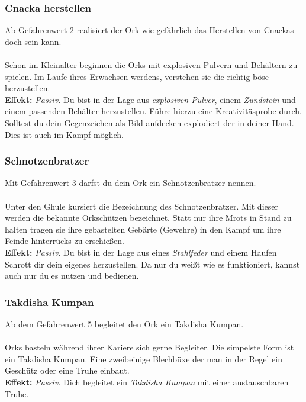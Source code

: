 \subsubsection*{ Cnacka herstellen} \label{sk:cnacka_herstellen}
Ab Gefahrenwert 2 realisiert der Ork wie gefährlich das Herstellen von Cnackas doch sein kann.\\
\\
Schon im Kleinalter beginnen die Orks mit explosiven Pulvern und Behältern zu spielen. Im Laufe ihres Erwachsen werdens, verstehen sie die  richtig böse herzustellen.\\
\textbf{Effekt:} \textit{Passiv.} Du bist in der Lage aus \textit{explosiven Pulver}, einem \textit{Zundstein} und einem passenden Behälter  herzustellen. Führe hierzu eine Kreativitäsprobe durch. Solltest du dein Gegenzeichen als Bild aufdecken explodiert der  in deiner Hand. Dies ist auch im Kampf möglich.

\subsubsection*{ Schnotzenbratzer} \label{sk:schnotzenbratzer}
Mit Gefahrenwert 3 darfst du dein Ork ein Schnotzenbratzer nennen.\\
\\
Unter den Ghule kursiert die Bezeichnung des Schnotzenbratzer. Mit dieser werden die bekannte Orkschützen bezeichnet. Statt nur ihre Mrots in Stand zu halten tragen sie ihre gebastelten Gebärte (Gewehre) in den Kampf um ihre Feinde hinterrücks zu erschießen.\\
\textbf{Effekt:} \textit{Passiv.} Du bist in der Lage aus eines \textit{Stahlfeder} und einem Haufen Schrott dir dein eigenes  herzustellen. Da nur du weißt wie es funktioniert, kannst auch nur du es nutzen und bedienen. 

\subsubsection*{ Takdisha Kumpan} \label{sk:Takdisha_Kumpan}
Ab dem Gefahrenwert 5 begleitet den Ork ein Takdisha Kumpan.\\
\\
Orks basteln während ihrer Kariere sich gerne Begleiter. Die simpelste Form ist ein Takdisha Kumpan. Eine zweibeinige Blechbüxe der man in der Regel ein Geschütz oder eine Truhe einbaut.\\
\textbf{Effekt:} \textit{Passiv.} Dich begleitet ein \textit{Takdisha Kumpan} mit einer austauschbaren Truhe.
 
